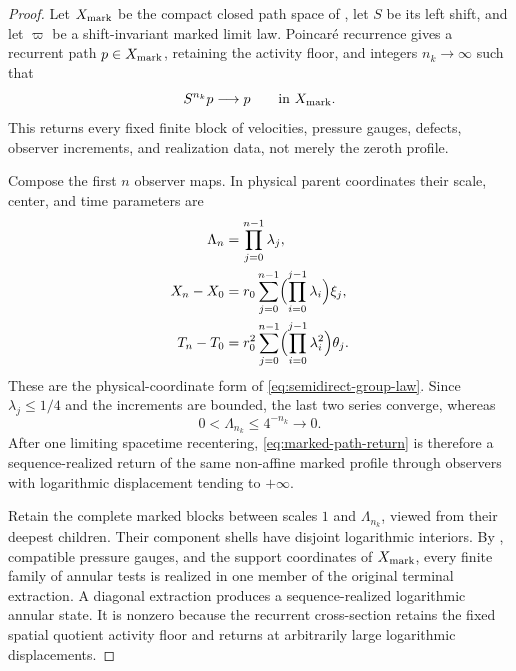 \documentclass[11pt]{amsart}
\numberwithin{equation}{section}
\theoremstyle{plain}
\theoremstyle{definition}
\theoremstyle{remark}
\begin{document}
\begin{proof}
Let \(X_{\rm mark}\) be the compact closed path space of
, let \(S\) be its left
shift, and let \(\varpi\) be a shift-invariant marked limit law.  Poincar\'e
recurrence gives a recurrent path \(p\in X_{\rm mark}\), retaining the
activity floor, and integers \(n_k\to\infty\) such that
\begin{equation}\label{eq:marked-path-return}
 S^{n_k}p\longrightarrow p
 \qquad\hbox{in }X_{\rm mark}.
\end{equation}
This returns every fixed finite block of velocities, pressure gauges, defects,
observer increments, and realization data, not merely the zeroth profile.

Compose the first \(n\) observer maps.  In physical parent coordinates their
scale, center, and time parameters are
\begin{align}
 \Lambda_n&=\prod_{j=0}^{n-1}\lambda_j,
 \label{eq:marked-return-total-scale}\\
 X_n-X_0&=r_0\sum_{j=0}^{n-1}
   \Bigl(\prod_{i=0}^{j-1}\lambda_i\Bigr)\xi_j,
 \label{eq:marked-return-total-center}\\
 T_n-T_0&=r_0^2\sum_{j=0}^{n-1}
   \Bigl(\prod_{i=0}^{j-1}\lambda_i^2\Bigr)\theta_j.
 \label{eq:marked-return-total-time}
\end{align}
These are the physical-coordinate form of
\eqref{eq:semidirect-group-law}.  Since \(\lambda_j\le1/4\) and the increments
are bounded, the last two series converge, whereas
\begin{equation}\label{eq:marked-return-scale-collapse}
 0<\Lambda_{n_k}\le4^{-n_k}\longrightarrow0.
\end{equation}
After one limiting spacetime recentering,
\eqref{eq:marked-path-return} is therefore a sequence-realized return of the
same non-affine marked profile through observers with logarithmic displacement
tending to \(+\infty\).

Retain the complete marked blocks between scales \(1\) and
\(\Lambda_{n_k}\), viewed from their deepest children.  Their component shells
have disjoint logarithmic interiors.  By
, compatible pressure gauges,
and the support coordinates of \(X_{\rm mark}\), every finite family of
annular tests is realized in one member of the original terminal extraction.
A diagonal extraction produces a sequence-realized logarithmic annular state.
It is nonzero because the recurrent cross-section retains the fixed spatial
quotient activity floor and returns at arbitrarily large logarithmic
displacements.


\end{proof}
\end{document}
